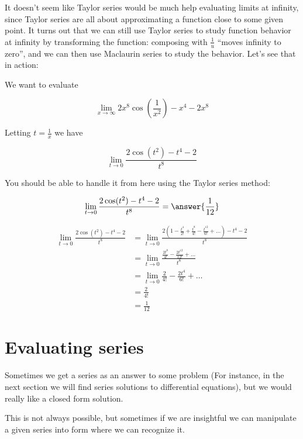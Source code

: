 \documentclass{ximera}
\begin{document}
It doesn't seem like Taylor series would be much help evaluating limits at infinity, since Taylor series are all about approximating a function close to some given point.  It turns out that we can still use Taylor series to study function behavior at infinity by transforming the function:  composing with $\frac{1}{u}$ ``moves infinity to zero'', and we can then use Maclaurin series to study the behavior.  Let's see that in action:

\begin{example}
	We want to evaluate
	
	\[
	\lim_{x \to \infty} 2x^8\cos(\frac{1}{x^2}) - x^4-2x^8
	\]
	
	Letting $t  =\frac{1}{x}$ we have
	
	\[
	\lim_{t \to 0} \frac{2\cos(t^2) - t^4-2}{t^8}
	\]
	
	You should be able to handle it from here using the Taylor series method:
	
	
	\[
	\lim_{t \to 0} \frac{2\cos(t^2) - t^4-2}{t^8} = \answer{\frac{1}{12}}
	\]
	
	\begin{hint}
		\begin{align*}
		\lim_{t \to 0} \frac{2\cos(t^2) - t^4-2}{t^8} &= \lim_{t \to 0} \frac{2(1-\frac{t^4}{2!}+\frac{t^8}{4!}-\frac{t^12}{6!}+\dots) - t^4-2}{t^8}\\
			&=  \lim_{t \to 0} \frac{\frac{2t^8}{4!}-\frac{2t^12}{12!}+\dots}{t^8}\\
			&=\lim_{t \to 0} \frac{2}{4!}-\frac{2t^4}{6!} +\dots\\
			&=\frac{2}{4!}\\
			&=\frac{1}{12}
		\end{align*}
	\end{hint}
	
\end{example}

\section{Evaluating series}

Sometimes we get a series as an answer to some problem (For instance, in the next section we will find series solutions to differential equations), but we would really like a closed form solution.

This is not always possible, but sometimes if we are insightful we can manipulate a given series into form where we can recognize it.
\end{document}
